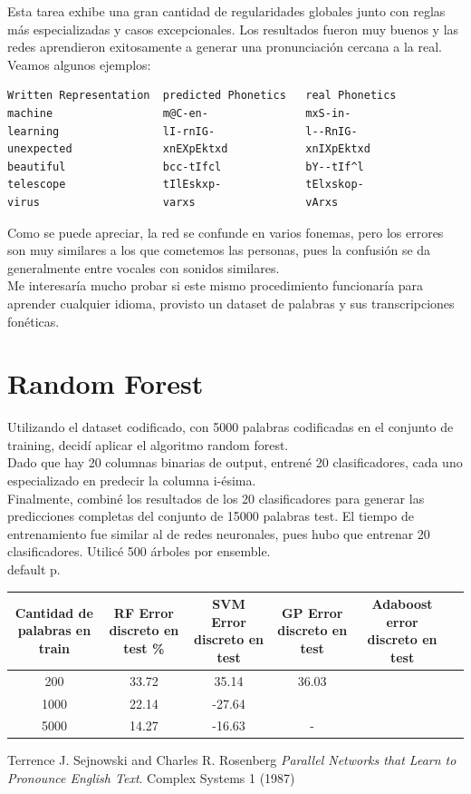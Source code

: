 \documentclass[paper=a4, fontsize=11pt]{scrartcl} %
\numberwithin{equation}{section} %
\numberwithin{figure}{section} %
\numberwithin{table}{section} %
\begin{document}
Esta tarea exhibe una gran cantidad de regularidades globales junto con reglas más especializadas y casos excepcionales. Los resultados fueron muy buenos y las redes aprendieron exitosamente a generar una pronunciación cercana a la real. Veamos algunos ejemplos:

\begin{center}
\begin{BVerbatim}
Written Representation  predicted Phonetics   real Phonetics  
machine                 m@C-en-               mxS-in-  
learning                lI-rnIG-              l--RnIG- 
unexpected              xnEXpEktxd            xnIXpEktxd  
beautiful               bcc-tIfcl             bY--tIf^l 
telescope               tIlEskxp-             tElxskop- 
virus                   varxs                 vArxs

\end{BVerbatim}
\end{center}


Como se puede apreciar, la red se confunde en varios fonemas, pero los errores son muy similares a los que cometemos las personas, pues la confusión se da generalmente entre vocales con sonidos similares. \\

Me interesaría mucho probar si este mismo procedimiento funcionaría para aprender cualquier idioma, provisto un dataset de palabras y sus transcripciones fonéticas. 

\section{Random Forest}

Utilizando el dataset codificado, con 5000 palabras codificadas en el conjunto de training, decidí aplicar el algoritmo random forest.\\
Dado que hay 20 columnas binarias de output, entrené 20 clasificadores, cada uno especializado en predecir la columna i-ésima. \\
Finalmente, combiné los resultados de los 20 clasificadores para generar las predicciones completas del conjunto de 15000 palabras test. El tiempo de entrenamiento fue similar al de redes neuronales, pues hubo que entrenar 20 clasificadores. Utilicé 500 árboles por ensemble.\\
default p.

\begin{center}
\begin{tabular}{ |c|c|c|c|c|c|  }
\hline
Cantidad de palabras en train & RF Error discreto en test \% & SVM Error discreto en test  & GP Error discreto en test & Adaboost error discreto en test\\
\hline 
200     & 33.72  & 35.14  & 36.03 & \\
1000    & 22.14  & -27.64 &    &\\
5000    & 14.27  & -16.63 &  - & \\ 
\hline
\end{tabular}
\end{center}





\begin{thebibliography}{9}
Terrence J. Sejnowski and Charles R. Rosenberg
\textit{Parallel Networks that Learn to Pronounce English Text}. 
Complex Systems 1 (1987)
 

\end{thebibliography}
\end{document}
